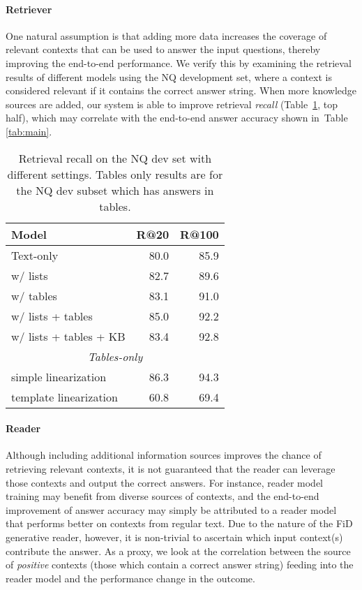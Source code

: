 \documentclass[11pt]{article}
\begin{document}
\paragraph{Retriever}

One natural assumption is that adding more data increases the coverage of relevant contexts that can be used to answer the input questions, thereby improving the end-to-end performance.
We verify this by examining the retrieval results of different models using the NQ development set, where a context is considered relevant if it contains the correct answer string. 
When more knowledge sources are added, our system is able to improve retrieval \emph{recall} (Table~\ref{tab:tables}, top half), which may correlate with the end-to-end answer accuracy shown in~Table \ref{tab:main}. 


\begin{table}[t]
\begin{center}
\begin{tabular}{lrr}
\toprule
\textbf{Model} & \textbf{R@20} & \textbf{R@100} \\ 
\midrule
Text-only  & 80.0 & 85.9  \\
w/ lists & 82.7 & 89.6 \\ 
w/ tables & 83.1 & 91.0 \\
w/ lists + tables & 85.0 & 92.2 \\
w/ lists + tables + KB & 83.4 & 92.8 \\
\midrule
\multicolumn{3}{c}{\textit{Tables-only}}\\
\midrule
simple linearization & 86.3 & 94.3 \\
template linearization & 60.8 & 69.4 \\
\bottomrule
\end{tabular}
\end{center}
\caption{Retrieval recall on the NQ dev set with different settings. Tables only results are for the NQ dev subset which has answers in tables.}
\label{tab:tables}
\vspace{-3mm}
\end{table} 
\paragraph{Reader}

Although including additional information sources improves the chance of retrieving relevant contexts, 
it is not guaranteed that the reader can leverage those contexts and output the correct answers.
For instance, reader model training may benefit from diverse sources of contexts, and the end-to-end improvement of answer accuracy may simply be attributed to a reader model that performs better on contexts from regular text.
Due to the nature of the FiD generative reader, however, it is non-trivial to ascertain which input context(s) contribute the answer.
As a proxy, we look at the correlation between the source of \emph{positive} contexts (those which contain a correct answer string) feeding into the reader model and the performance change in the outcome. 
\end{document}
